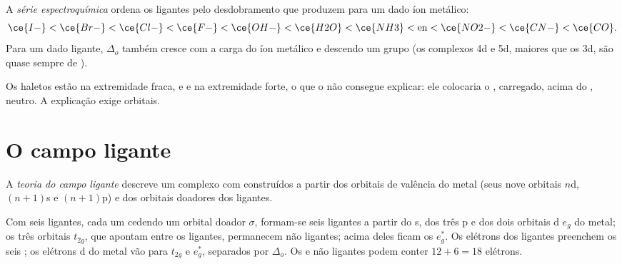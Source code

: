 \begin{definition}\label{def:b2:ligand-field:spectrochemical}
A \emph{série espectroquímica} ordena os ligantes
pelo desdobramento que produzem para um dado íon metálico:
\[
  \ce{I-} < \ce{Br-} < \ce{Cl-} < \ce{F-} < \ce{OH-} < \ce{H2O} < \ce{NH3} < \text{en} <
  \ce{NO2-} < \ce{CN-} < \ce{CO} .
\]
Para um dado ligante, $\Delta_o$ também cresce com a carga do íon metálico e
descendo um grupo (os complexos 4d e 5d, maiores que os 3d, são quase sempre de
).
\end{definition}

Os haletos estão na extremidade fraca, e  e  na extremidade
forte, o que o  não consegue explicar: ele colocaria
o , carregado, acima do , neutro. A explicação exige orbitais.

\section{O campo ligante}

\begin{definition}\label{def:b2:ligand-field:ligand-field}
A \emph{teoria do campo ligante} descreve um complexo com
 construídos a partir dos orbitais de valência do metal
(seus nove orbitais $n$d, $(n+1)$s e $(n+1)$p) e dos orbitais doadores dos
ligantes.
\end{definition}

\begin{proposition}\label{prop:b2:ligand-field:mo-octahedral}
Com seis ligantes, cada um cedendo um orbital doador $\sigma$, formam-se seis
 ligantes a partir do s, dos três p e dos dois orbitais d
$e_g$ do metal; os três orbitais $t_{2g}$, que apontam entre os ligantes,
permanecem não ligantes; acima deles ficam os  $e_g^*$. Os
elétrons dos ligantes preenchem os seis ; os elétrons d do
metal vão para $t_{2g}$ e $e_g^*$, separados por $\Delta_o$. Os  e não ligantes podem conter $12 + 6 = 18$ elétrons.
\end{proposition}


